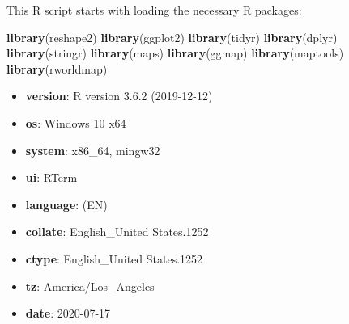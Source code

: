 \documentclass[
]{article}
\newenvironment{Shaded}{\begin{snugshade}}{\end{snugshade}}
\newcommand{\KeywordTok}[1]{\textcolor[rgb]{0.13,0.29,0.53}{\textbf{#1}}}
\newcommand{\NormalTok}[1]{#1}
\providecommand{\tightlist}{%
  \setlength{\itemsep}{0pt}\setlength{\parskip}{0pt}}
\begin{document}
This R script starts with loading the necessary R packages:

\begin{Shaded}
\begin{Highlighting}[]
\KeywordTok{library}\NormalTok{(reshape2)}
\KeywordTok{library}\NormalTok{(ggplot2)}
\KeywordTok{library}\NormalTok{(tidyr)}
\KeywordTok{library}\NormalTok{(dplyr)}
\KeywordTok{library}\NormalTok{(stringr)}
\KeywordTok{library}\NormalTok{(maps)}
\KeywordTok{library}\NormalTok{(ggmap)}
\KeywordTok{library}\NormalTok{(maptools)}
\KeywordTok{library}\NormalTok{(rworldmap)}
\end{Highlighting}
\end{Shaded}

\captionsetup[table]{labelformat=empty}

\begin{itemize}
\tightlist
\item
  \textbf{version}: R version 3.6.2 (2019-12-12)
\item
  \textbf{os}: Windows 10 x64
\item
  \textbf{system}: x86\_64, mingw32
\item
  \textbf{ui}: RTerm
\item
  \textbf{language}: (EN)
\item
  \textbf{collate}: English\_United States.1252
\item
  \textbf{ctype}: English\_United States.1252
\item
  \textbf{tz}: America/Los\_Angeles
\item
  \textbf{date}: 2020-07-17
\end{itemize}
\end{document}
